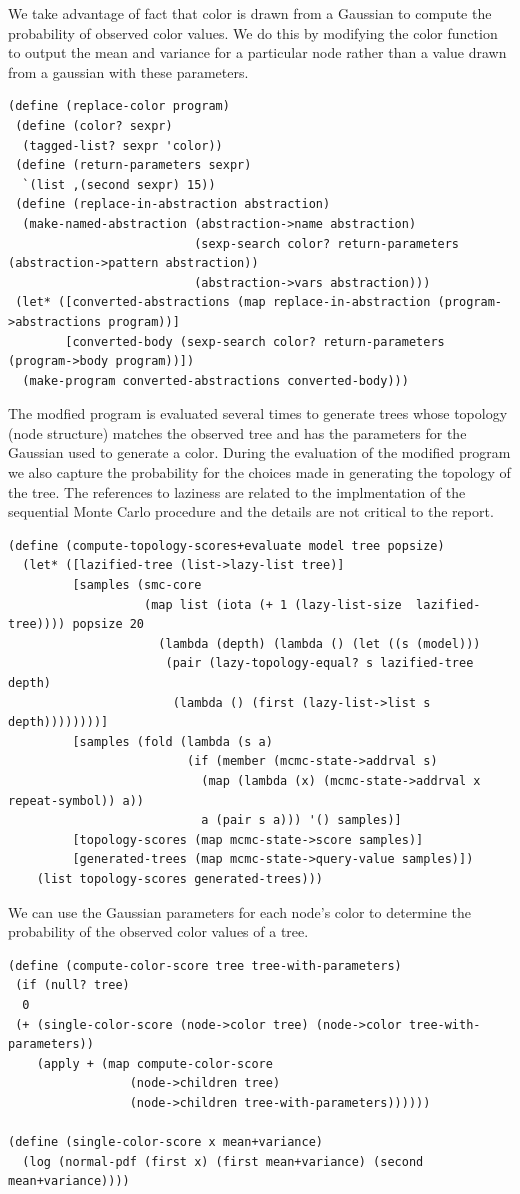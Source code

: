 \documentclass[a4paper,10pt]{article}
\begin{document}
We take advantage of fact that color is drawn from a Gaussian to compute the probability of observed color values.  We do this by modifying the color function to output the mean and variance for a particular node rather than a value drawn from a gaussian with these parameters.
\begin{lstlisting}[frame=trBL]
(define (replace-color program)
 (define (color? sexpr)
  (tagged-list? sexpr 'color))
 (define (return-parameters sexpr)
  `(list ,(second sexpr) 15))
 (define (replace-in-abstraction abstraction)
  (make-named-abstraction (abstraction->name abstraction) 
                          (sexp-search color? return-parameters (abstraction->pattern abstraction)) 
                          (abstraction->vars abstraction)))
 (let* ([converted-abstractions (map replace-in-abstraction (program->abstractions program))]
        [converted-body (sexp-search color? return-parameters (program->body program))])
  (make-program converted-abstractions converted-body)))
\end{lstlisting}
The modfied program is evaluated several times to generate trees whose topology (node structure) matches the observed tree and has the parameters for the Gaussian used to generate a color.  During the evaluation of the modified program we also capture the probability for the choices made in generating the topology of the tree.  The references to laziness are related to the implmentation of the sequential Monte Carlo procedure and the details are not critical to the report.
\begin{lstlisting}[frame=trBL]
(define (compute-topology-scores+evaluate model tree popsize)
  (let* ([lazified-tree (list->lazy-list tree)]
         [samples (smc-core 
                   (map list (iota (+ 1 (lazy-list-size  lazified-tree)))) popsize 20
                     (lambda (depth) (lambda () (let ((s (model)))
                      (pair (lazy-topology-equal? s lazified-tree depth)
                       (lambda () (first (lazy-list->list s depth))))))))]
         [samples (fold (lambda (s a) 
                         (if (member (mcmc-state->addrval s) 
                           (map (lambda (x) (mcmc-state->addrval x repeat-symbol)) a)) 
                           a (pair s a))) '() samples)]
         [topology-scores (map mcmc-state->score samples)]
         [generated-trees (map mcmc-state->query-value samples)])
    (list topology-scores generated-trees)))
\end{lstlisting}
We can use the Gaussian parameters for each node's color to determine the probability of the observed color values of a tree.
\begin{lstlisting}[frame=trBL]
(define (compute-color-score tree tree-with-parameters)
 (if (null? tree)
  0
 (+ (single-color-score (node->color tree) (node->color tree-with-parameters)) 
    (apply + (map compute-color-score 
                 (node->children tree) 
                 (node->children tree-with-parameters))))))

(define (single-color-score x mean+variance)
  (log (normal-pdf (first x) (first mean+variance) (second mean+variance))))
\end{lstlisting}
\end{document}
